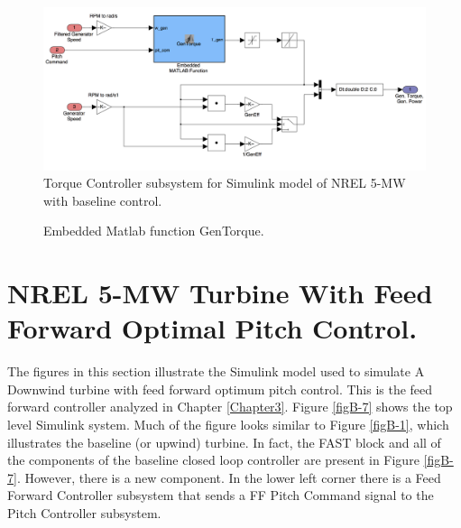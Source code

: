  \begin{figure}[ht]
	\centering
		\includegraphics[width=\linewidth]{Figures/AppendixBFigures/baseline5.png}
	\caption{Torque Controller subsystem for Simulink model of NREL 5-MW with baseline control.}
	\label{figB-5}
\end{figure}

 \begin{figure}[ht]
	\centering
	\caption{Embedded Matlab function GenTorque.}
	\label{figB-6}
\end{figure}


\section{NREL 5-MW Turbine With Feed Forward Optimal Pitch Control.} \label{sectionB-2}
	
The figures in this section illustrate the Simulink model used to simulate A Downwind turbine with feed forward optimum pitch control. This is the feed forward controller analyzed in Chapter \ref{Chapter3}. Figure \ref{figB-7} shows the top level Simulink system. Much of the figure looks similar to Figure \ref{figB-1}, which illustrates the baseline (or upwind) turbine. In fact, the FAST block and all of the components of the baseline closed loop controller are present in Figure \ref{figB-7}. However, there is a new component. In the lower left corner there is a Feed Forward Controller subsystem that sends a FF Pitch Command signal to the Pitch Controller subsystem.
 
